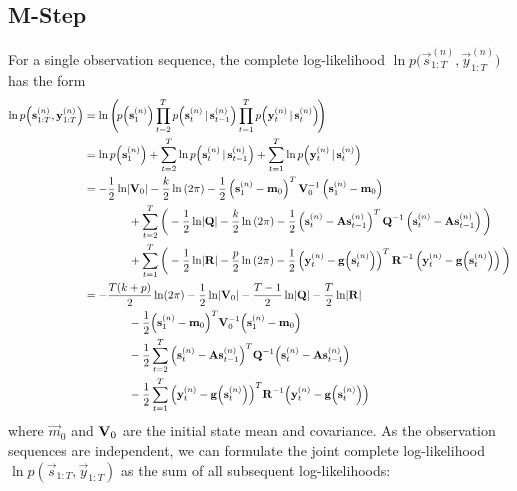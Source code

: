 \subsection{M-Step}
	For a single observation sequence, the complete log-likelihood \( \ln p\Big(\vec{s}_{1:T}^{(n)}, \vec{y}_{1:T}^{(n)}\Big) \) has the form
	\begin{align*}
		\ln p\Big(\vec{s}_{1:T}^{(n)}, \vec{y}_{1:T}^{(n)}\Big)
			&= \ln \Bigg(\! p\Big(\vec{s}_1^{(n)}\Big) \prod_{t = 2}^{T} p\Big(\vec{s}_t^{(n)} \given \vec{s}_{t - 1}^{(n)}\Big) \prod_{t = 1}^{T} p\Big(\vec{y}_t^{(n)} \given \vec{s}_t^{(n)}\Big) \!\Bigg) \\
			&= \ln p\Big(\vec{s}_1^{(n)}\Big) + \sum_{t = 2}^{T} \ln p\Big(\vec{s}_t^{(n)} \given \vec{s}_{t - 1}^{(n)}\Big) + \sum_{t = 1}^{T} \ln p\Big(\vec{y}_t^{(n)} \given \vec{s}_t^{(n)}\Big) \\
			&= \logGaussianMulti{\vec{s}_1^{(n)}}{\vec{m}_0}{\mat{V}_0}{k} \\
				&\qquad\qquad + \sum_{t = 2}^{T} \bigg( \logGaussianMulti{\vec{s}_t^{(n)}}{\mat{A} \vec{s}_{t - 1}^{(n)}}{\mat{Q}}{k} \bigg) \\
				&\qquad\qquad + \sum_{t = 1}^{T} \bigg( \logGaussianMulti{\vec{y}_t^{(n)}}{\vec{g}\Big(\vec{s}_t^{(n)}\Big)}{\mat{R}}{p} \bigg) \\
			&= -\frac{T(k + p)}{2} \ln(2\pi) - \frac{1}{2} \ln \lvert \mat{V}_0 \rvert - \frac{T - 1}{2} \ln \lvert \mat{Q} \rvert - \frac{T}{2} \ln \lvert \mat{R} \rvert \\
				&\qquad\qquad -\frac{1}{2} \Big( \vec{s}_1^{(n)} - \vec{m}_0 \Big)^T \mat{V}_0^{-1} \Big( \vec{s}_1^{(n)} - \vec{m}_0 \Big) \\
				&\qquad\qquad -\frac{1}{2} \sum_{t = 2}^{T} \Big( \vec{s}_t^{(n)} - \mat{A} \vec{s}_{t - 1}^{(n)} \Big)^T \mat{Q}^{-1} \Big( \vec{s}_t^{(n)} - \mat{A} \vec{s}_{t - 1}^{(n)} \Big) \\
				&\qquad\qquad -\frac{1}{2} \sum_{t = 1}^{T} \Big( \vec{y}_t^{(n)} - \vec{g}\Big(\vec{s}_t^{(n)}\Big) \Big)^T \mat{R}^{-1} \Big( \vec{y}_t^{(n)} - \vec{g}\Big(\vec{s}_t^{(n)}\Big) \Big)
	\end{align*}
	where \( \vec{m}_0 \) and \( \mat{V}_0 \) are the initial state mean and covariance. As the observation sequences are independent, we can formulate the joint complete log-likelihood \( \ln p(\vec{s}_{1:T}, \vec{y}_{1:T}) \) as the sum of all subsequent log-likelihoods:
